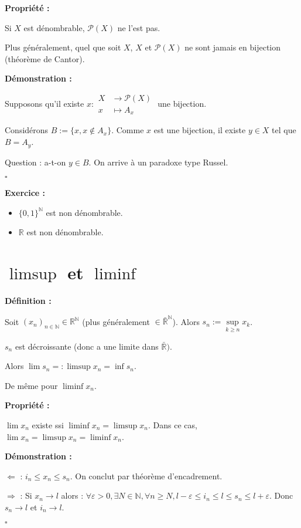 \documentclass[10pt,a4paper,notitlepage ]{article}
\newenvironment{definition}{
	
	\textbf{Définition : }
}
{}
\newenvironment{propriete}{
	\begin{tcolorbox}
		\textbf{Propriété : }
}
{\end{tcolorbox}}
\newenvironment{demo}{

	\textbf{Démonstration :}
}{\begin{flushright}
	$\square$
\end{flushright}
}
\newenvironment{exo}{
	
	\textbf{Exercice :} }{}
\begin{document}
\begin{propriete}
	Si $X$ est dénombrable, $\mathcal P(X)$ ne l'est pas.
	
	Plus généralement, quel que soit $X$, $X$ et $\mathcal P(X)$ ne sont jamais en bijection (théorème de Cantor).
\end{propriete}

\begin{demo}
	Supposons qu'il existe $x: \begin{aligned} X & \rightarrow \mathcal P(X) \\
		x & \mapsto A_x \end{aligned}$ une bijection.
	
	Considérons $B := \{x, x\notin A_x\}$. Comme $x$ est une bijection, il existe $y \in X$ tel que $B = A_y$.
	
	Question : a-t-on $y\in B$. On arrive à un paradoxe type Russel.
\end{demo}

\begin{exo}
\begin{itemize}	
	\item $\{0,1\}^\mathbb N$ est non dénombrable.
	
	\item $\mathbb R$ est non dénombrable.
	
\end{itemize}
\end{exo}

\part*{$\limsup$ et $\liminf$}

\begin{definition}
	
Soit $(x_n)_{n\in\mathbb N} \in \mathbb R ^\mathbb N$ (plus généralement $\in\bar{\mathbb R}^\mathbb N$). Alors $s_n := \underset{k\geq n}{\sup} x_k$.

$s_n$ est décroissante (donc a une limite dans $\bar{\mathbb R})$.

Alors $\lim s_n =: \limsup x_n = \inf s_n$.

De même pour $\liminf x_n$. 
\end{definition}
\begin{propriete}
	$\lim x_n$ existe ssi $\liminf x_n = \limsup x_n$. Dans ce cas, $\lim x_n = \limsup x_n = \liminf x_n$.
\end{propriete}

\begin{demo}
	$\Leftarrow$ : $i_n \leq x_n \leq s_n$. On conclut par théorème d'encadrement.
	
	$\Rightarrow$ : Si $x_n \rightarrow l$ alors : $\forall \varepsilon > 0, \exists N \in \mathbb N, \forall n \geq N, l-\varepsilon \leq i_n \leq l \leq s_n \leq l+\varepsilon$.
	Donc $s_n \rightarrow l$ et $i_n \rightarrow l$.
\end{demo}
\end{document}
